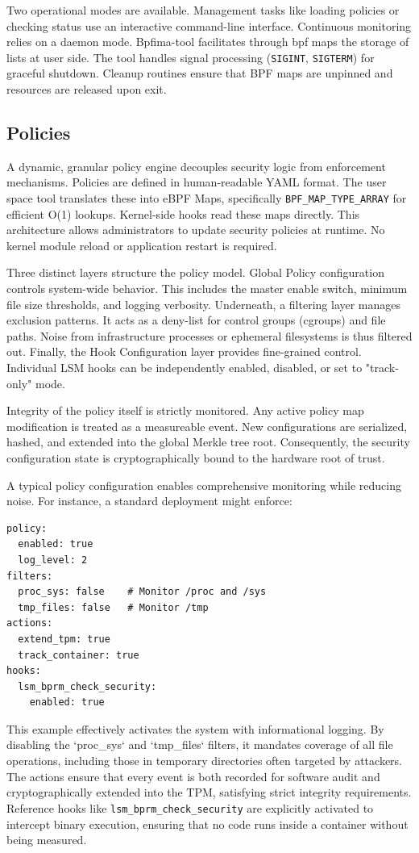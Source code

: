 Two operational modes are available.
Management tasks like loading policies or checking status use an interactive command-line interface.
Continuous monitoring relies on a daemon mode.
Bpfima-tool facilitates through bpf maps the storage of lists at user side.
The tool handles signal processing (\texttt{SIGINT}, \texttt{SIGTERM}) for graceful shutdown.
Cleanup routines ensure that BPF maps are unpinned and resources are released upon exit.

\subsection{Policies}
A dynamic, granular policy engine decouples security logic from enforcement mechanisms.
Policies are defined in human-readable YAML format.
The user space tool translates these into \ac{eBPF} Maps, specifically \texttt{BPF\_MAP\_TYPE\_ARRAY} for efficient O(1) lookups.
Kernel-side hooks read these maps directly.
This architecture allows administrators to update security policies at runtime.
No kernel module reload or application restart is required.

Three distinct layers structure the policy model.
Global Policy configuration controls system-wide behavior.
This includes the master enable switch, minimum file size thresholds, and logging verbosity.
Underneath, a filtering layer manages exclusion patterns.
It acts as a deny-list for control groups (cgroups) and file paths.
Noise from infrastructure processes or ephemeral filesystems is thus filtered out.
Finally, the Hook Configuration layer provides fine-grained control.
Individual \ac{LSM} hooks can be independently enabled, disabled, or set to "track-only" mode.

Integrity of the policy itself is strictly monitored.
Any active policy map modification is treated as a measureable event.
New configurations are serialized, hashed, and extended into the global Merkle tree root.
Consequently, the security configuration state is cryptographically bound to the hardware root of trust.

A typical policy configuration enables comprehensive monitoring while reducing noise.
For instance, a standard deployment might enforce:
\begin{verbatim}
policy:
  enabled: true
  log_level: 2
filters:
  proc_sys: false    # Monitor /proc and /sys
  tmp_files: false   # Monitor /tmp
actions:
  extend_tpm: true
  track_container: true
hooks:
  lsm_bprm_check_security:
    enabled: true
\end{verbatim}
This example effectively activates the system with informational logging.
By disabling the `proc_sys` and `tmp_files` filters, it mandates coverage of all file operations, including those in temporary directories often targeted by attackers.
The actions ensure that every event is both recorded for software audit and cryptographically extended into the \ac{TPM}, satisfying strict integrity requirements.
Reference hooks like \texttt{lsm\_bprm\_check\_security} are explicitly activated to intercept binary execution, ensuring that no code runs inside a container without being measured.

